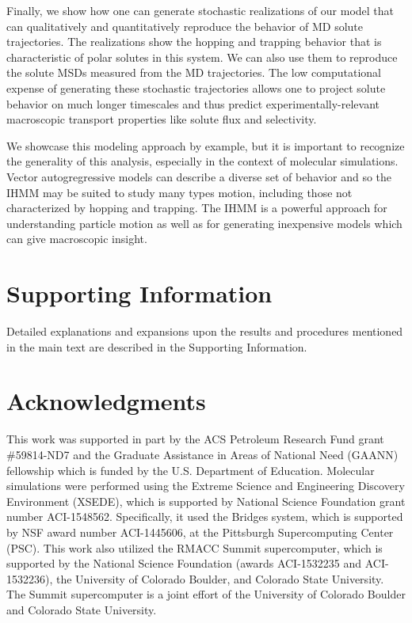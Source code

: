 \documentclass[journal=jpcbfk,manuscript=article]{achemso}
\begin{document}
  Finally, we show how one can generate stochastic realizations of our model that
  can qualitatively and quantitatively reproduce the behavior of MD solute 
  trajectories. The realizations show the hopping and trapping behavior that is
  characteristic of polar solutes in this system. We can also use them to reproduce
  the solute MSDs measured from the MD trajectories. The low computational expense 
  of generating these stochastic trajectories allows one to project solute behavior
  on much longer timescales and thus predict experimentally-relevant macroscopic 
  transport properties like solute flux and selectivity.
  
  We showcase this modeling approach by example, but it is important to
  recognize the generality of this analysis, especially in the context of molecular
  simulations. Vector autogregressive models can describe a diverse set of behavior
  and so the IHMM may be suited to study many types motion, including those not 
  characterized by hopping and trapping. The IHMM is a powerful approach for 
  understanding particle motion as well as for generating inexpensive models
  which can give macroscopic insight.
  
  \section*{Supporting Information}

  Detailed explanations and expansions upon the results and procedures mentioned in
  the main text are described in the Supporting Information. 

  \section*{Acknowledgments}

  This work was supported in part by the ACS Petroleum Research Fund
  grant \#59814-ND7 and the Graduate Assistance in Areas of National Need (GAANN) 
  fellowship which is funded by the U.S. Department of Education. 
  Molecular simulations were performed using the Extreme Science and
  Engineering Discovery Environment (XSEDE), which is supported by National
  Science Foundation grant number ACI-1548562. Specifically, it used the Bridges
  system, which is supported by NSF award number ACI-1445606, at the Pittsburgh
  Supercomputing Center (PSC). This work also utilized the RMACC Summit supercomputer,
  which is supported by the National Science Foundation (awards ACI-1532235 and
  ACI-1532236), the University of Colorado Boulder, and Colorado State
  University. The Summit supercomputer is a joint effort of the University of
  Colorado Boulder and Colorado State University.

  \clearpage

  
  


\end{document}
